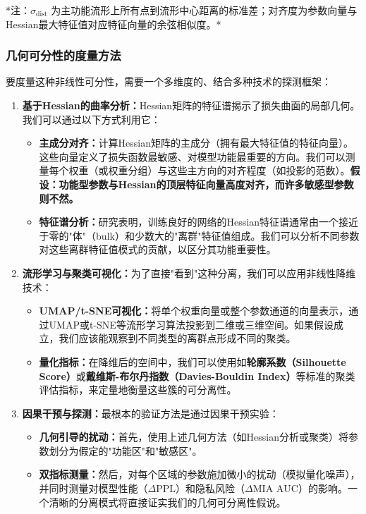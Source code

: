 \documentclass[letterpaper,twocolumn,10pt]{article}
\begin{document}
*注：$\sigma_{\text{dist}}$ 为主功能流形上所有点到流形中心距离的标准差；对齐度为参数向量与Hessian最大特征值对应特征向量的余弦相似度。*

\subsubsection{几何可分性的度量方法}

要度量这种非线性可分性，需要一个多维度的、结合多种技术的探测框架：

\begin{enumerate}
\item \textbf{基于Hessian的曲率分析：}Hessian矩阵的特征谱揭示了损失曲面的局部几何。我们可以通过以下方式利用它：
\begin{itemize}
\item \textbf{主成分对齐：}计算Hessian矩阵的主成分（拥有最大特征值的特征向量）。这些向量定义了损失函数最敏感、对模型功能最重要的方向。我们可以测量每个权重（或权重分组）与这些主方向的对齐程度（如投影的范数）。\textbf{假设：功能型参数与Hessian的顶层特征向量高度对齐，而许多敏感型参数则不然。}

\item \textbf{特征谱分析：}研究表明，训练良好的网络的Hessian特征谱通常由一个接近于零的"体"（bulk）和少数大的"离群"特征值组成。我们可以分析不同参数对这些离群特征值模式的贡献，以区分其功能重要性。
\end{itemize}

\item \textbf{流形学习与聚类可视化：}为了直接"看到"这种分离，我们可以应用非线性降维技术：
\begin{itemize}
\item \textbf{UMAP/t-SNE可视化：}将单个权重向量或整个参数通道的向量表示，通过UMAP或t-SNE等流形学习算法投影到二维或三维空间。如果假设成立，我们应该能观察到不同类型的离群点形成不同的聚类。

\item \textbf{量化指标：}在降维后的空间中，我们可以使用如\textbf{轮廓系数（Silhouette Score）}或\textbf{戴维斯-布尔丹指数（Davies-Bouldin Index）}等标准的聚类评估指标，来定量地衡量这些簇的可分离性。
\end{itemize}

\item \textbf{因果干预与探测：}最根本的验证方法是通过因果干预实验：
\begin{itemize}
\item \textbf{几何引导的扰动：}首先，使用上述几何方法（如Hessian分析或聚类）将参数划分为假定的"功能区"和"敏感区"。

\item \textbf{双指标测量：}然后，对每个区域的参数施加微小的扰动（模拟量化噪声），并同时测量对模型性能（$\Delta \text{PPL}$）和隐私风险（$\Delta \text{MIA AUC}$）的影响。一个清晰的分离模式将直接证实我们的几何可分离性假说。
\end{itemize}
\end{enumerate}
\end{document}
